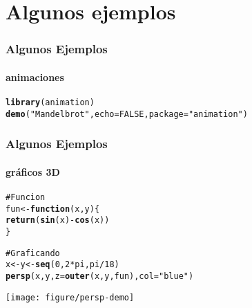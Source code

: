 \documentclass[10pt, letterpaper]{beamer}\usepackage{graphicx, color}
\makeatletter
\newcommand{\hlfunctioncall}[1]{\textcolor[rgb]{0.501960784313725,0,0.329411764705882}{\textbf{#1}}}%
\newcommand{\hlstring}[1]{\textcolor[rgb]{0.6,0.6,1}{#1}}%
\newcommand{\hlcomment}[1]{\textcolor[rgb]{0.180392156862745,0.6,0.341176470588235}{#1}}%
\newenvironment{kframe}{%
 \def\at@end@of@kframe{}%
 \ifinner\ifhmode%
  \def\at@end@of@kframe{\end{minipage}}%
  \begin{minipage}{\columnwidth}%
 \fi\fi%
 \def\FrameCommand##1{\hskip\@totalleftmargin \hskip-\fboxsep
 \colorbox{shadecolor}{##1}\hskip-\fboxsep
     \hskip-\linewidth \hskip-\@totalleftmargin \hskip\columnwidth}%
 \MakeFramed {\advance\hsize-\width
   \@totalleftmargin\z@ \linewidth\hsize
   \@setminipage}}%
 {\par\unskip\endMakeFramed%
 \at@end@of@kframe}
\newenvironment{knitrout}{}{} %
\makeatother
\begin{document}
\section{Algunos ejemplos}

\begin{frame}[fragile]
\frametitle{Algunos Ejemplos}
\framesubtitle{animaciones}
\begin{knitrout}
\color{fgcolor}\begin{kframe}
\begin{alltt}
\hlfunctioncall{library}(animation)
\hlfunctioncall{demo}(\hlstring{"Mandelbrot"}, echo = FALSE, package = \hlstring{"animation"})
\end{alltt}
\end{kframe}




















\end{knitrout}

\end{frame}


\begin{frame}[fragile]
\frametitle{Algunos Ejemplos}
\framesubtitle{gr\'aficos 3D}
\begin{knitrout}\footnotesize
{}\color{fgcolor}\begin{kframe}
\begin{alltt}
\hlcomment{# Funcion}
fun <- \hlfunctioncall{function}(x, y) \{
    \hlfunctioncall{return}(\hlfunctioncall{sin}(x) - \hlfunctioncall{cos}(x))
\}

\hlcomment{# Graficando}
x <- y <- \hlfunctioncall{seq}(0, 2 * pi, pi/18)
\hlfunctioncall{persp}(x, y, z = \hlfunctioncall{outer}(x, y, fun), col = \hlstring{"blue"})
\end{alltt}
\end{kframe}
\texttt{[image: figure/persp-demo]} 

\end{knitrout}

\end{frame}
\end{document}
